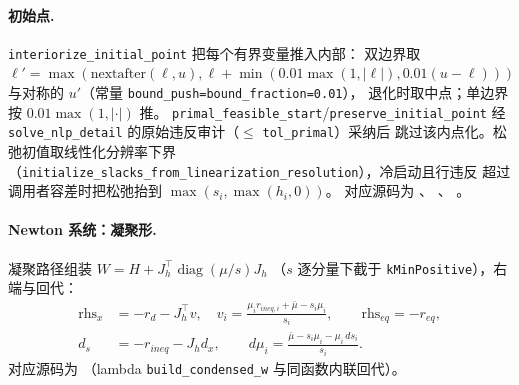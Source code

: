 \paragraph{初始点.}
\texttt{interiorize\_initial\_point} 把每个有界变量推入内部：
双边界取
$\ell' = \max(\mathrm{nextafter}(\ell,u), \ell + \min(0.01\max(1,|\ell|),
0.01(u-\ell)))$ 与对称的 $u'$（常量 \texttt{bound\_push=bound\_fraction=0.01}），
退化时取中点；单边界按 $0.01\max(1,|\cdot|)$ 推。
\texttt{primal\_feasible\_start}/\texttt{preserve\_initial\_point} 经
\texttt{solve\_nlp\_detail} 的原始违反审计（$\le$ \texttt{tol\_primal}）采纳后
跳过该内点化。松弛初值取线性化分辨率下界
（\texttt{initialize\_slacks\_from\_linearization\_resolution}），冷启动且行违反
超过调用者容差时把松弛抬到 $\max(s_i, \max(h_i, 0))$。
对应源码为 、
、
。

\paragraph{Newton 系统：凝聚形.}
凝聚路径组装 $W = H + J_h^{\top} \operatorname{diag}(\mu/s) J_h$
（$s$ 逐分量下截于 \texttt{kMinPositive}），右端与回代：
\begin{align}
  \mathrm{rhs}_x &= -r_d - J_h^{\top} v,\quad
  v_i = \frac{\mu_i r_{ineq,i} + \bar\mu - s_i \mu_i}{s_i},\qquad
  \mathrm{rhs}_{eq} = -r_{eq},
  \label{eq:ipm:condensed-rhs}\\
  d_s &= -r_{ineq} - J_h d_x,\qquad
  d\mu_i = \frac{\bar\mu - s_i \mu_i - \mu_i\, d s_i}{s_i}.
  \label{eq:ipm:condensed-back}
\end{align}
对应源码为 
（lambda \texttt{build\_condensed\_w} 与同函数内联回代）。

